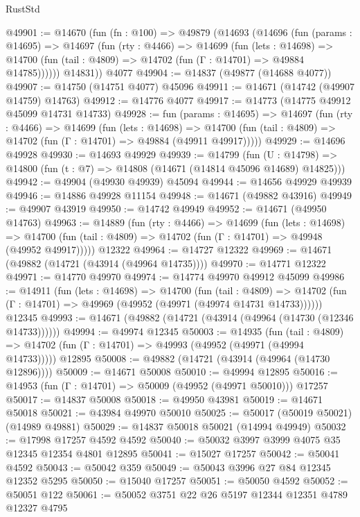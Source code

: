 \begin{lexlean}{RustStd}
\begin{coremodule}
@49901 := @14670
    (fun (fn : @100) =>
    @49879
      (@14693
        (@14696
          (fun (params : @14695) =>
          @14697
            (fun (rty : @4466) =>
            @14699
              (fun (lets : @14698) =>
              @14700 (fun (tail : @4809) => @14702 (fun (Γ : @14701) => @49884 @14785))))))
        @14831))
    @4077
@49904 := @14837 (@49877 (@14688 @4077))
@49907 := @14750 (@14751 @4077) @45096
@49911 := @14671 (@14742 (@49907 @14759) @14763)
@49912 := @14776 @4077
@49917 := @14773 (@14775 @49912 @45099 @14731 @14733)
@49928 := fun (params : @14695) =>
  @14697
    (fun (rty : @4466) =>
    @14699
      (fun (lets : @14698) =>
      @14700 (fun (tail : @4809) => @14702 (fun (Γ : @14701) => @49884 (@49911 @49917)))))
@49929 := @14696 @49928
@49930 := @14693 @49929
@49939 := @14799
    (fun (U : @14798) => @14800 (fun (t : @7) => @14808 (@14671 (@14814 @45096 @14689) @14825)))
@49942 := @49904 (@49930 @49939) @45094
@49944 := @14656 @49929 @49939
@49946 := @14886 @49928 @11154
@49948 := @14671 (@49882 @43916)
@49949 := @49907 @43919
@49950 := @14742 @49949
@49952 := @14671 (@49950 @14763)
@49963 := @14889
    (fun (rty : @4466) =>
    @14699
      (fun (lets : @14698) =>
      @14700 (fun (tail : @4809) => @14702 (fun (Γ : @14701) => @49948 (@49952 @49917)))))
    @12322
@49964 := @14727 @12322
@49969 := @14671 (@49882 (@14721 (@43914 (@49964 @14735))))
@49970 := @14771 @12322
@49971 := @14770 @49970
@49974 := @14774 @49970 @49912 @45099
@49986 := @14911
    (fun (lets : @14698) =>
    @14700
      (fun (tail : @4809) =>
      @14702 (fun (Γ : @14701) => @49969 (@49952 (@49971 (@49974 @14731 @14733))))))
    @12345
@49993 := @14671 (@49882 (@14721 (@43914 (@49964 (@14730 (@12346 @14733))))))
@49994 := @49974 @12345
@50003 := @14935
    (fun (tail : @4809) => @14702 (fun (Γ : @14701) => @49993 (@49952 (@49971 (@49994 @14733)))))
    @12895
@50008 := @49882 (@14721 (@43914 (@49964 (@14730 @12896))))
@50009 := @14671 @50008
@50010 := @49994 @12895
@50016 := @14953 (fun (Γ : @14701) => @50009 (@49952 (@49971 @50010))) @17257
@50017 := @14837 @50008
@50018 := @49950 @43981
@50019 := @14671 @50018
@50021 := @43984 @49970 @50010
@50025 := @50017 (@50019 @50021) (@14989 @49881)
@50029 := @14837 @50018 @50021 (@14994 @49949)
@50032 := @17998 @17257 @4592 @4592
@50040 := @50032 @3997 @3999 @4075 @35 @12345 @12354 @4801 @12895
@50041 := @15027 @17257
@50042 := @50041 @4592
@50043 := @50042 @359
@50049 := @50043 @3996 @27 @84 @12345 @12352 @5295
@50050 := @15040 @17257
@50051 := @50050 @4592
@50052 := @50051 @122
@50061 := @50052 @3751 @22 @26 @5197 @12344 @12351 @4789 @12327 @4795

\end{coremodule}
\end{lexlean}
